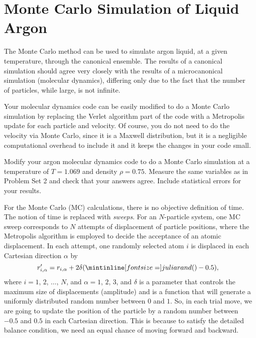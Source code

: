 \section{Monte Carlo Simulation of Liquid Argon}

The Monte Carlo method can be used to simulate argon liquid, at a given temperature, through
the canonical ensemble. The results of a canonical simulation should agree very closely with
the results of a microcanonical simulation (molecular dynamics), differing only due to the
fact that the number of particles, while large, is not infinite.

Your molecular dynamics code can be easily modified to do a Monte Carlo simulation by
replacing the Verlet algorithm part of the code with a Metropolis update for each particle
and velocity. Of course, you do not need to do the velocity via Monte Carlo, since it is a
Maxwell distribution, but it is a negligible computational overhead to include it and it
keeps the changes in your code small.

\Question{}
Modify your argon molecular dynamics code to do a Monte Carlo simulation at a temperature of
\(T = 1.069\) and density \(\rho = 0.75\). Measure the same variables as in Problem Set 2
and check that your answers agree. Include statistical errors for your results.

\Answer{}
For the Monte Carlo (MC) calculations, there is no objective definition of time. The notion
of time is replaced with \emph{sweeps}. For an \(N\)-particle system, one MC sweep
corresponds to \(N\) attempts of displacement of particle positions, where the Metropolis
algorithm is employed to decide the acceptance of an atomic displacement. In each attempt,
one randomly selected atom \(i\) is displaced in each Cartesian direction
\(\alpha\) by
%
\begin{equation}
    r_{i, \alpha}' = r_{i, \alpha} + 2 \delta (\code{rand()} - 0.5),
\end{equation}
%
where \(i = 1\), \(2\), \(\ldots\), \(N\), and \(\alpha = 1\), \(2\), \(3\),
and \(\delta\) is a parameter that controls the maximum size of displacements (amplitude)
and  is a function that will generate a
uniformly distributed random number between \(0\) and \(1\).
So, in each trial move, we are going to update the position of the particle
by a random number between \(-0.5\) and \(0.5\) in each Cartesian direction.
This is because to satisfy the detailed balance condition, we need an equal chance
of moving forward and backward.

